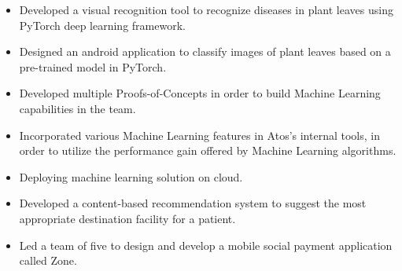 \documentclass[10pt,a4paper,ragged2e]{altacv}
\begin{document}
\divider

\begin{itemize}
\item Developed a visual recognition tool to recognize diseases in plant leaves using PyTorch deep learning framework.
\item Designed an android application to classify images of plant leaves based on a pre-trained model in PyTorch.
\end{itemize}

\divider

\begin{itemize}
\item Developed multiple Proofs-of-Concepts in order to build Machine Learning capabilities in the team.
\smallskip
\item Incorporated various Machine Learning features in Atos's internal tools, in order to utilize the performance gain offered by Machine Learning algorithms.
\item Deploying machine learning solution on cloud.
\end{itemize}

\divider

\begin{itemize}
\item Developed a content-based recommendation system to suggest the most appropriate destination facility for a patient.
\end{itemize}

\divider

\begin{itemize}
\item Led a team of five to design and develop a mobile social payment application called Zone.
\end{itemize}










\end{document}
